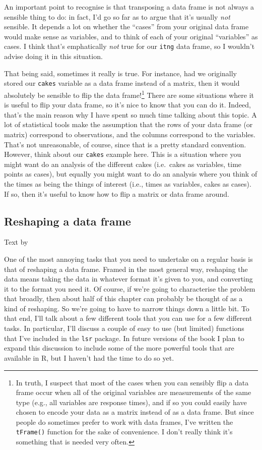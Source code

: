 \documentclass[
]{book}
\begin{document}
An important point to recognise is that transposing a data frame is not always a sensible thing to do: in fact, I'd go so far as to argue that it's usually \emph{not} sensible. It depends a lot on whether the ``cases'' from your original data frame would make sense as variables, and to think of each of your original ``variables'' as cases. I think that's emphatically \emph{not} true for our \texttt{itng} data frame, so I wouldn't advise doing it in this situation.

That being said, sometimes it really is true. For instance, had we originally stored our \texttt{cakes} variable as a data frame instead of a matrix, then it would absolutely be sensible to flip the data frame!\footnote{In truth, I suspect that most of the cases when you can sensibly flip a data frame occur when all of the original variables are measurements of the same type (e.g., all variables are response times), and if so you could easily have chosen to encode your data as a matrix instead of as a data frame. But since people do sometimes prefer to work with data frames, I've written the \texttt{tFrame()} function for the sake of convenience. I don't really think it's something that is needed very often.} There are some situations where it is useful to flip your data frame, so it's nice to know that you can do it. Indeed, that's the main reason why I have spent so much time talking about this topic. A lot of statistical tools make the assumption that the rows of your data frame (or matrix) correspond to observations, and the columns correspond to the variables. That's not unreasonable, of course, since that is a pretty standard convention. However, think about our \texttt{cakes} example here. This is a situation where you might want do an analysis of the different cakes (i.e.~cakes as variables, time points as cases), but equally you might want to do an analysis where you think of the times as being the things of interest (i.e., times as variables, cakes as cases). If so, then it's useful to know how to flip a matrix or data frame around.

\hypertarget{reshape}{%
\subsection{Reshaping a data frame}\label{reshape}}

Text by \citet{Navarro2018}

One of the most annoying tasks that you need to undertake on a regular basis is that of reshaping a data frame. Framed in the most general way, reshaping the data means taking the data in whatever format it's given to you, and converting it to the format you need it. Of course, if we're going to characterise the problem that broadly, then about half of this chapter can probably be thought of as a kind of reshaping. So we're going to have to narrow things down a little bit. To that end, I'll talk about a few different tools that you can use for a few different tasks. In particular, I'll discuss a couple of easy to use (but limited) functions that I've included in the \texttt{lsr} package. In future versions of the book I plan to expand this discussion to include some of the more powerful tools that are available in R, but I haven't had the time to do so yet.
\end{document}
